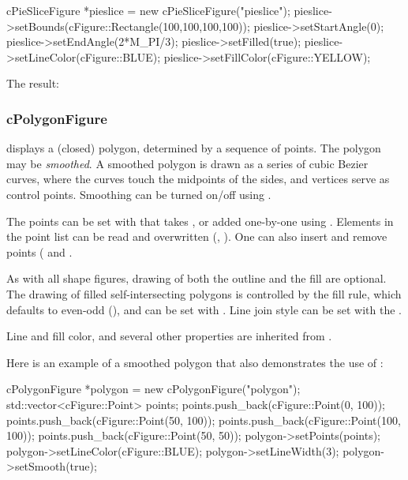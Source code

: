 \begin{cpp}
cPieSliceFigure *pieslice = new cPieSliceFigure("pieslice");
pieslice->setBounds(cFigure::Rectangle(100,100,100,100));
pieslice->setStartAngle(0);
pieslice->setEndAngle(2*M_PI/3);
pieslice->setFilled(true);
pieslice->setLineColor(cFigure::BLUE);
pieslice->setFillColor(cFigure::YELLOW);
\end{cpp}


The result:

\begin{center}

\end{center}


\subsubsection{cPolygonFigure}
\label{sec:graphics:polygonfigure}

 displays a (closed) polygon, determined by a sequence of points.
The polygon may be \textit{smoothed}. A smoothed polygon is drawn as a series
of cubic Bezier curves, where the curves touch the midpoints of the sides,
and vertices serve as control points. Smoothing can be turned on/off
using .

The points can be set with  that takes ,
or added one-by-one using . Elements in the point list can be
read and overwritten (, ). One can also
insert and remove points ( and .

As with all shape figures, drawing of both the outline and the fill
are optional. The drawing of filled self-intersecting polygons is controlled
by the fill rule, which defaults to even-odd (), and
can be set with . Line join style can be set with
the .

Line and fill color, and several other properties are inherited from
.

Here is an example of a smoothed polygon that also demonstrates
the use of :

\begin{cpp}
cPolygonFigure *polygon = new cPolygonFigure("polygon");
std::vector<cFigure::Point> points;
points.push_back(cFigure::Point(0, 100));
points.push_back(cFigure::Point(50, 100));
points.push_back(cFigure::Point(100, 100));
points.push_back(cFigure::Point(50, 50));
polygon->setPoints(points);
polygon->setLineColor(cFigure::BLUE);
polygon->setLineWidth(3);
polygon->setSmooth(true);
\end{cpp}

